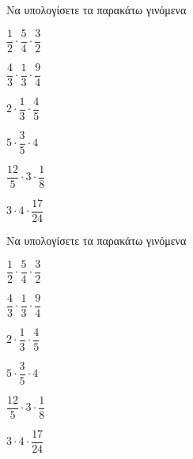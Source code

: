 Να υπολογίσετε τα παρακάτω γινόμενα
\begin{multicols}{3}
\begin{alist}
\item $ \dfrac{1}{2}\cdot\dfrac{5}{4}\cdot\dfrac{3}{2} $
\item $ \dfrac{4}{3}\cdot\dfrac{1}{3}\cdot\dfrac{9}{4} $
\item $ 2\cdot\dfrac{1}{3}\cdot\dfrac{4}{5} $
\item $ 5\cdot\dfrac{3}{5}\cdot 4 $
\item $ \dfrac{12}{5}\cdot 3\cdot\dfrac{1}{8} $
\item $ 3\cdot 4\cdot\dfrac{17}{24} $
\end{alist}
\end{multicols}
Να υπολογίσετε τα παρακάτω γινόμενα
\begin{multicols}{3}
\begin{alist}
\item $ \dfrac{1}{2}\cdot\dfrac{5}{4}\cdot\dfrac{3}{2} $
\item $ \dfrac{4}{3}\cdot\dfrac{1}{3}\cdot\dfrac{9}{4} $
\item $ 2\cdot\dfrac{1}{3}\cdot\dfrac{4}{5} $
\item $ 5\cdot\dfrac{3}{5}\cdot 4 $
\item $ \dfrac{12}{5}\cdot 3\cdot\dfrac{1}{8} $
\item $ 3\cdot 4\cdot\dfrac{17}{24} $
\end{alist}
\end{multicols}
